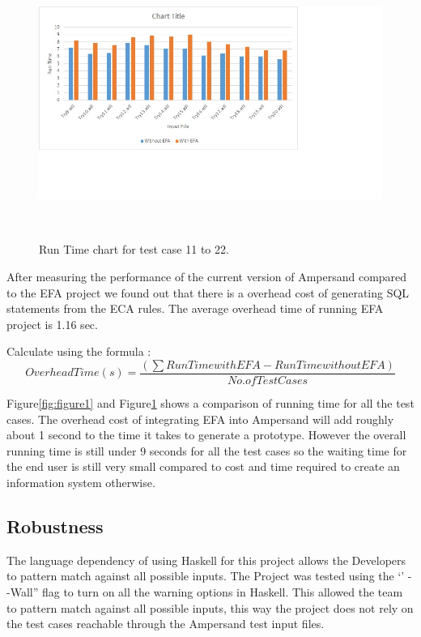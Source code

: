 \documentclass[12pt, svgnames]{article}
\begin{document}
\begin{figure}
  \centering
    \includegraphics[width=1.3\textwidth]{./Chart2}
\caption{Run Time chart for test case 11 to 22.}~\label{fig:figure2}
\end{figure}

After measuring the performance of the current version of Ampersand compared to the EFA project we found out that there is a overhead cost of generating SQL statements from the ECA rules. The average overhead time of running EFA project is 1.16 sec. 

Calculate using the formula : 
\begin{equation}
	Overhead Time(s) =\frac{\left ( \sum  Run Time with EFA - Run Time without EFA\right )}{ No. of Test Cases}
\end{equation}

Figure\ref{fig:figure1} and Figure\ref{fig:figure2} shows a comparison of running time for all the test cases. The overhead cost of integrating EFA into Ampersand will add roughly about 1 second to the time it takes to generate a prototype. However the overall running time is still under 9 seconds for all the test cases so the waiting time for the end user is still very small compared to cost and time required to create an information system otherwise.


\subsection{Robustness}
The language dependency of using Haskell for this project allows the Developers to pattern match against all possible inputs. The Project was tested using the `' - -Wall'' flag to turn on all the warning options in Haskell. This allowed the team to pattern match against all possible inputs, this way the project does not rely on the test cases reachable through the Ampersand test input files.	
\end{document}
